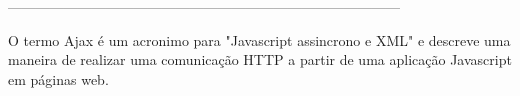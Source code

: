 ------------------------------------------------------------------------------------




O termo Ajax é um acronimo para "Javascript assincrono e XML" \citep{Garrett2005} e descreve uma maneira de realizar uma comunicação HTTP a partir de uma aplicação Javascript em páginas web.









